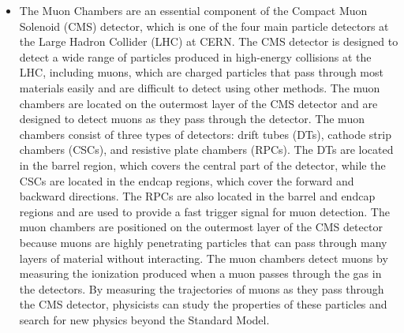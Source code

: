 \begin{itemize}
\item The Muon Chambers are an essential component of the Compact Muon Solenoid (CMS) detector, which is one of the four main particle detectors at the Large Hadron Collider (LHC) at CERN. The CMS detector is designed to detect a wide range of particles produced in high-energy collisions at the LHC, including muons, which are charged particles that pass through most materials easily and are difficult to detect using other methods. The muon chambers are located on the outermost layer of the CMS detector and are designed to detect muons as they pass through the detector. The muon chambers consist of three types of detectors: drift tubes (DTs), cathode strip chambers (CSCs), and resistive plate chambers (RPCs). The DTs are located in the barrel region, which covers the central part of the detector, while the CSCs are located in the endcap regions, which cover the forward and backward directions. The RPCs are also located in the barrel and endcap regions and are used to provide a fast trigger signal for muon detection. The muon chambers are positioned on the outermost layer of the CMS detector because muons are highly penetrating particles that can pass through many layers of material without interacting. The muon chambers detect muons by measuring the ionization produced when a muon passes through the gas in the detectors. By measuring the trajectories of muons as they pass through the CMS detector, physicists can study the properties of these particles and search for new physics beyond the Standard Model.



\end{itemize}
